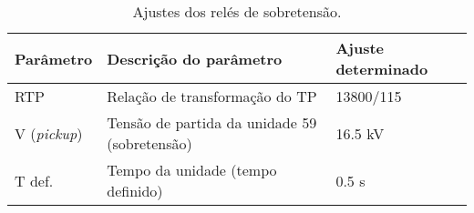 \begin{table}[H]
\centering
\caption{Ajustes dos relés de sobretensão.}
\label{table:3}
\begin{adjustbox}{width=\columnwidth,center}
\begin{tabular}{|l|l|l|}
\hline
\textbf{Parâmetro} & \textbf{Descrição do parâmetro} & \textbf{Ajuste determinado} \\ \hline

RTP & Relação de transformação do TP & 13800/115\\ \hline
V (\textit{pickup}) & Tensão de partida da unidade 59 (sobretensão) & 16.5 kV\\ \hline
T def. & Tempo da unidade (tempo definido) & 0.5 s\\ \hline
\end{tabular}
\end{adjustbox}
\end{table}